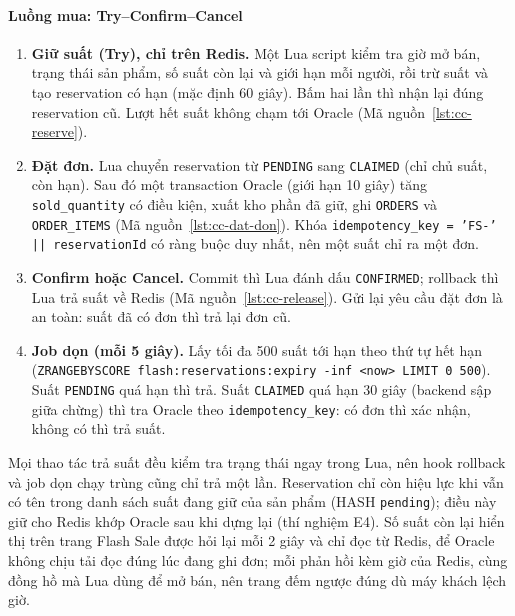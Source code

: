 \paragraph{Luồng mua: Try--Confirm--Cancel}\label{sec:cc-tcc}
\begin{enumerate}
  \item \textbf{Giữ suất (Try), chỉ trên Redis.} Một Lua script kiểm tra giờ mở bán, trạng thái sản phẩm, số suất còn lại và giới hạn mỗi người, rồi trừ suất và tạo reservation có hạn (mặc định 60 giây). Bấm hai lần thì nhận lại đúng reservation cũ. Lượt hết suất không chạm tới Oracle (Mã nguồn~\ref{lst:cc-reserve}).
  \item \textbf{Đặt đơn.} Lua chuyển reservation từ \texttt{PENDING} sang \texttt{CLAIMED} (chỉ chủ suất, còn hạn). Sau đó một transaction Oracle (giới hạn 10 giây) tăng \texttt{sold\_\allowbreak quantity} có điều kiện, xuất kho phần đã giữ, ghi \texttt{ORDERS} và \texttt{ORDER\_\allowbreak ITEMS} (Mã nguồn~\ref{lst:cc-dat-don}). Khóa \texttt{idempotency\_\allowbreak key = 'FS-' || reservationId} có ràng buộc duy nhất, nên một suất chỉ ra một đơn.
  \item \textbf{Confirm hoặc Cancel.} Commit thì Lua đánh dấu \texttt{CONFIRMED}; rollback thì Lua trả suất về Redis (Mã nguồn~\ref{lst:cc-release}). Gửi lại yêu cầu đặt đơn là an toàn: suất đã có đơn thì trả lại đơn cũ.
  \item \textbf{Job dọn (mỗi 5 giây).} Lấy tối đa 500 suất tới hạn theo thứ tự hết hạn (\texttt{ZRANGEBYSCORE flash:\allowbreak reservations:\allowbreak expiry -inf <now> LIMIT 0 500}). Suất \texttt{PENDING} quá hạn thì trả. Suất \texttt{CLAIMED} quá hạn 30 giây (backend sập giữa chừng) thì tra Oracle theo \texttt{idempotency\_\allowbreak key}: có đơn thì xác nhận, không có thì trả suất.
\end{enumerate}

Mọi thao tác trả suất đều kiểm tra trạng thái ngay trong Lua, nên hook rollback và job dọn chạy trùng cũng chỉ trả một lần. Reservation chỉ còn hiệu lực khi vẫn có tên trong danh sách suất đang giữ của sản phẩm (HASH \texttt{pending}); điều này giữ cho Redis khớp Oracle sau khi dựng lại (thí nghiệm E4). Số suất còn lại hiển thị trên trang Flash Sale được hỏi lại mỗi 2 giây và chỉ đọc từ Redis, để Oracle không chịu tải đọc đúng lúc đang ghi đơn; mỗi phản hồi kèm giờ của Redis, cùng đồng hồ mà Lua dùng để mở bán, nên trang đếm ngược đúng dù máy khách lệch giờ.

